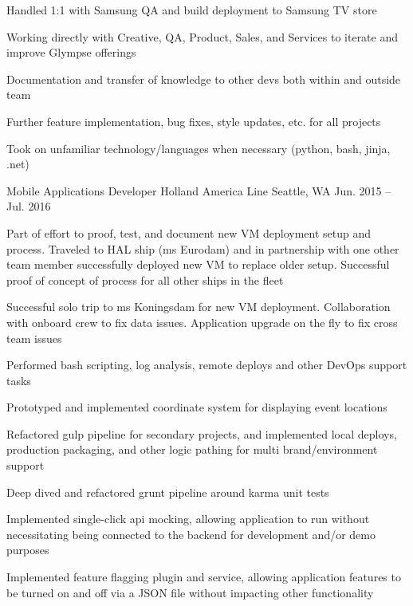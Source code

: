 \begin{cventries}
{\begin{cvitems}
        \item {Handled 1:1 with Samsung QA and build deployment to Samsung TV store}
        \item {Working directly with Creative, QA, Product, Sales, and Services to iterate and improve Glympse offerings}
        \item {Documentation and transfer of knowledge to other devs both within and outside team}
        \item {Further feature implementation, bug fixes, style updates, etc. for all projects}
        \item {Took on unfamiliar technology/languages when necessary (python, bash, jinja, .net)}
      \end{cvitems}
    }

  \cventry
    {Mobile Applications Developer} %
    {Holland America Line} %
    {Seattle, WA} %
    {Jun. 2015 – Jul. 2016} %
    {
      \begin{cvitems} %
        \item {Part of effort to proof, test, and document new VM deployment setup and process. Traveled to HAL ship (ms Eurodam) and in partnership with one other team member successfully deployed new VM to replace older setup. Successful proof of concept of process for all other ships in the fleet}
        \item {Successful solo trip to ms Koningsdam for new VM deployment. Collaboration with onboard crew to fix data issues. Application upgrade on the fly to fix cross team issues}
        \item {Performed bash scripting, log analysis, remote deploys and other DevOps support tasks}
        \item {Prototyped and implemented coordinate system for displaying event locations}
        \item {Refactored gulp pipeline for secondary projects, and implemented local deploys, production packaging, and other logic pathing for multi brand/environment support}
        \item {Deep dived and refactored grunt pipeline around karma unit tests}
        \item {Implemented single-click api mocking, allowing application to run without necessitating being connected to the backend for development and/or demo purposes}
        \item {Implemented feature flagging plugin and service, allowing application features to be turned on and off via a JSON file without impacting other functionality}
      \end{cvitems}
    }

\end{cventries}

